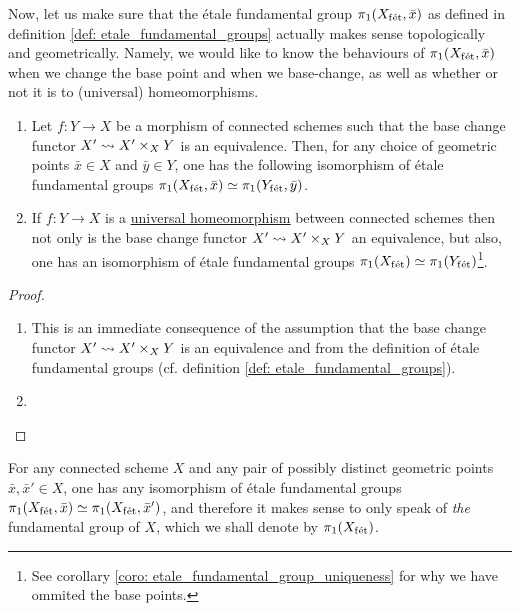        Now, let us make sure that the \'etale fundamental group $\pi_1(X_{\mathrm{f\acute{e}t}}, \bar{x})$ as defined in definition \ref{def: etale_fundamental_groups} actually makes sense topologically and geometrically. Namely, we would like to know the behaviours of $\pi_1(X_{\mathrm{f\acute{e}t}}, \bar{x})$ when we change the base point and when we base-change, as well as whether or not it is  to (universal) homeomorphisms.
        \begin{proposition} \label{prop: the_etale_fundamental_group_as_a_topological_invariance}
            \noindent
            \begin{enumerate}
                \item Let $f: Y \to X$ be a morphism of connected schemes such that the base change functor $X' \mapsto X' \x_X Y$ is an equivalence. Then, for any choice of geometric points $\bar{x} \in X$ and $\bar{y} \in Y$, one has the following isomorphism of \'etale fundamental groups $\pi_1(X_{\mathrm{f\acute{e}t}}, \bar{x}) \simeq \pi_1(Y_{\mathrm{f\acute{e}t}}, \bar{y})$.
                \item If $f: Y \to X$ is a \href{https://stacks.math.columbia.edu/tag/04DC}{\underline{universal homeomorphism}} between connected schemes then not only is the base change functor $X' \mapsto X' \x_X Y$ an equivalence, but also, one has an isomorphism of \'etale fundamental groups $\pi_1(X_{\mathrm{f\acute{e}t}}) \simeq \pi_1(Y_{\mathrm{f\acute{e}t}})$\footnote{See corollary \ref{coro: etale_fundamental_group_uniqueness} for why we have ommited the base points.}. 
            \end{enumerate}
        \end{proposition}
            \begin{proof}
                \noindent
                \begin{enumerate}
                    \item This is an immediate consequence of the assumption that the base change functor $X' \mapsto X' \x_X Y$ is an equivalence and from the definition of \'etale fundamental groups (cf. definition \ref{def: etale_fundamental_groups}).
                    \item 
                \end{enumerate}
            \end{proof}
        \begin{corollary} \label{coro: etale_fundamental_group_uniqueness}
            For any connected scheme $X$ and any pair of possibly distinct geometric points $\bar{x}, \bar{x}' \in X$, one has any isomorphism of \'etale fundamental groups $\pi_1(X_{\mathrm{f\acute{e}t}}, \bar{x}) \simeq \pi_1(X_{\mathrm{f\acute{e}t}}, \bar{x}')$, and therefore it makes sense to only speak of \textit{the} fundamental group of $X$, which we shall denote by $\pi_1(X_{\mathrm{f\acute{e}t}})$.
        \end{corollary}
        
